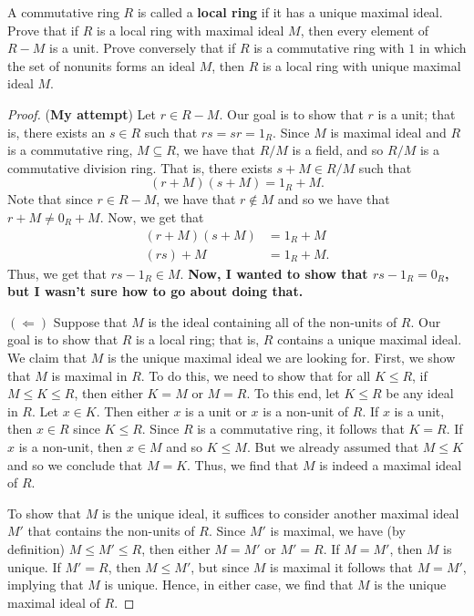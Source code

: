 \documentclass[a4paper]{article}
\begin{document}
\begin{problem}[Problem 37]
   A commutative ring \( R  \) is called a \textbf{local ring} if it has a unique maximal ideal. Prove that if \( R  \) is a local ring with maximal ideal \( M  \), then every element of \( R - M  \) is a unit. Prove conversely that if \(  R \) is a commutative ring with \( 1  \) in which the set of nonunits forms an ideal \( M  \), then \( R  \) is a local ring with unique maximal ideal \( M \).
\end{problem}
\begin{proof}
    (\textbf{My attempt}) Let \( r \in R - M  \). Our goal is to show that \( r  \) is a unit; that is, there exists an \( s \in R  \) such that \( rs = sr = {1}_{R} \). Since \( M  \) is maximal ideal and \( R  \) is a commutative ring, \( M \subseteq R  \), we have that \( R / M  \) is a field, and so \( R / M  \) is a commutative division ring. That is, there exists \( s + M \in R / M  \) such that 
    \[  (r+ M)(s + M) = {1}_{R} + M.   \]
    Note that since \( r \in R - M  \), we have that \( r \notin M  \) and so we have that \( r + M \neq {0}_{R} +  M \). Now, we get that 
    \begin{align*}
        (r+ M) (s + M) &= {1}_{R} +  M \\
        (rs) + M  &= {1}_{R} + M.
    \end{align*}
    Thus, we get that \( rs - {1}_{R} \in M  \). \textbf{Now, I wanted to show that \( rs - {1}_{R} = {0}_{R} \), but I wasn't sure how to go about doing that.}

    \( (\Longleftarrow) \) Suppose that \( M  \) is the ideal containing all of the non-units of \( R  \). Our goal is to show that \( R  \) is a local ring; that is, \( R  \) contains a unique maximal ideal. We claim that \( M  \) is the unique maximal ideal we are looking for. First, we show that \( M  \) is maximal in \( R  \). To do this, we need to show that for all \( K \leq R  \), if \( M \leq K \leq R   \), then either \( K = M  \) or \( M =R  \). To this end, let \( K \leq R  \) be any ideal in \( R  \). Let \( x \in K  \). Then either \( x  \) is a unit or \( x  \) is a non-unit of \( R  \). If \( x  \) is a unit, then \( x \in R  \) since \( K \leq R  \). Since \( R  \) is a commutative ring, it follows that \( K = R   \). If \( x  \) is a non-unit, then \( x \in M  \) and so \( K \leq M  \). But we already assumed that \( M \leq K  \) and so we conclude that \( M = K  \). Thus, we find that \( M  \) is indeed a maximal ideal of \( R  \).

    To show that \( M  \) is the unique ideal, it suffices to consider another maximal ideal \( M' \) that contains the non-units of \( R  \). Since \( M' \) is maximal, we have (by definition) \( M \leq M' \leq R  \), then either \( M = M' \) or \( M' = R  \). If \( M = M' \), then \( M  \) is unique. If \( M' = R \), then \( M \leq M'  \), but since \( M  \) is maximal it follows that \( M = M' \), implying that \( M  \) is unique. Hence, in either case, we find that \( M  \) is the unique maximal ideal of \( R  \).
\end{proof}
\end{document}
